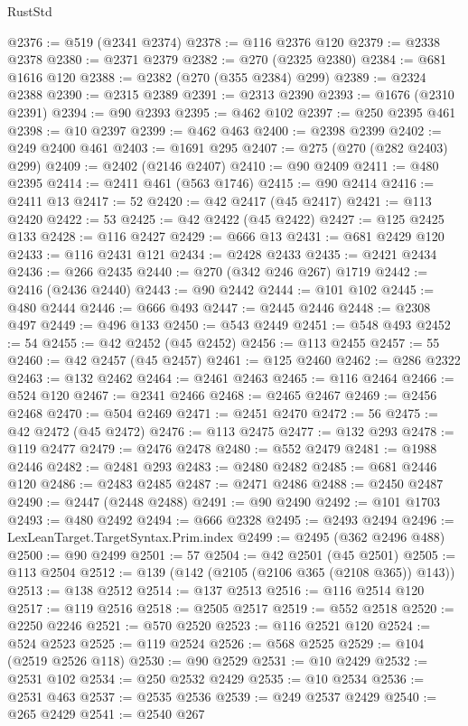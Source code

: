 \begin{lexlean}{RustStd}
\begin{coremodule}
@2376 := @519 (@2341 @2374)
@2378 := @116 @2376 @120
@2379 := @2338 @2378
@2380 := @2371 @2379
@2382 := @270 (@2325 @2380)
@2384 := @681 @1616 @120
@2388 := @2382 (@270 (@355 @2384) @299)
@2389 := @2324 @2388
@2390 := @2315 @2389
@2391 := @2313 @2390
@2393 := @1676 (@2310 @2391)
@2394 := @90 @2393
@2395 := @462 @102
@2397 := @250 @2395 @461
@2398 := @10 @2397
@2399 := @462 @463
@2400 := @2398 @2399
@2402 := @249 @2400 @461
@2403 := @1691 @295
@2407 := @275 (@270 (@282 @2403) @299)
@2409 := @2402 (@2146 @2407)
@2410 := @90 @2409
@2411 := @480 @2395
@2414 := @2411 @461 (@563 @1746)
@2415 := @90 @2414
@2416 := @2411 @13
@2417 := 52
@2420 := @42 @2417 (@45 @2417)
@2421 := @113 @2420
@2422 := 53
@2425 := @42 @2422 (@45 @2422)
@2427 := @125 @2425 @133
@2428 := @116 @2427
@2429 := @666 @13
@2431 := @681 @2429 @120
@2433 := @116 @2431 @121
@2434 := @2428 @2433
@2435 := @2421 @2434
@2436 := @266 @2435
@2440 := @270 (@342 @246 @267) @1719
@2442 := @2416 (@2436 @2440)
@2443 := @90 @2442
@2444 := @101 @102
@2445 := @480 @2444
@2446 := @666 @493
@2447 := @2445 @2446
@2448 := @2308 @497
@2449 := @496 @133
@2450 := @543 @2449
@2451 := @548 @493
@2452 := 54
@2455 := @42 @2452 (@45 @2452)
@2456 := @113 @2455
@2457 := 55
@2460 := @42 @2457 (@45 @2457)
@2461 := @125 @2460
@2462 := @286 @2322
@2463 := @132 @2462
@2464 := @2461 @2463
@2465 := @116 @2464
@2466 := @524 @120
@2467 := @2341 @2466
@2468 := @2465 @2467
@2469 := @2456 @2468
@2470 := @504 @2469
@2471 := @2451 @2470
@2472 := 56
@2475 := @42 @2472 (@45 @2472)
@2476 := @113 @2475
@2477 := @132 @293
@2478 := @119 @2477
@2479 := @2476 @2478
@2480 := @552 @2479
@2481 := @1988 @2446
@2482 := @2481 @293
@2483 := @2480 @2482
@2485 := @681 @2446 @120
@2486 := @2483 @2485
@2487 := @2471 @2486
@2488 := @2450 @2487
@2490 := @2447 (@2448 @2488)
@2491 := @90 @2490
@2492 := @101 @1703
@2493 := @480 @2492
@2494 := @666 @2328
@2495 := @2493 @2494
@2496 := LexLeanTarget.TargetSyntax.Prim.index
@2499 := @2495 (@362 @2496 @488)
@2500 := @90 @2499
@2501 := 57
@2504 := @42 @2501 (@45 @2501)
@2505 := @113 @2504
@2512 := @139 (@142 (@2105 (@2106 @365 (@2108 @365)) @143))
@2513 := @138 @2512
@2514 := @137 @2513
@2516 := @116 @2514 @120
@2517 := @119 @2516
@2518 := @2505 @2517
@2519 := @552 @2518
@2520 := @2250 @2246
@2521 := @570 @2520
@2523 := @116 @2521 @120
@2524 := @524 @2523
@2525 := @119 @2524
@2526 := @568 @2525
@2529 := @104 (@2519 @2526 @118)
@2530 := @90 @2529
@2531 := @10 @2429
@2532 := @2531 @102
@2534 := @250 @2532 @2429
@2535 := @10 @2534
@2536 := @2531 @463
@2537 := @2535 @2536
@2539 := @249 @2537 @2429
@2540 := @265 @2429
@2541 := @2540 @267

\end{coremodule}
\end{lexlean}
